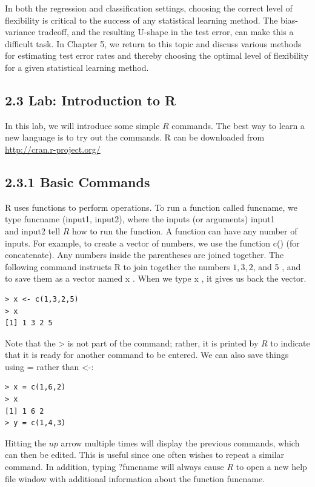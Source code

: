 \documentclass[10pt]{article}
\begin{document}
In both the regression and classification settings, choosing the correct level of flexibility is critical to the success of any statistical learning method. The bias-variance tradeoff, and the resulting U-shape in the test error, can make this a difficult task. In Chapter 5, we return to this topic and discuss various methods for estimating test error rates and thereby choosing the optimal level of flexibility for a given statistical learning method.

\subsection*{2.3 Lab: Introduction to R}
In this lab, we will introduce some simple $R$ commands. The best way to learn a new language is to try out the commands. R can be downloaded from\\
\href{http://cran.r-project.org/}{http://cran.r-project.org/}

\subsection*{2.3.1 Basic Commands}
R uses functions to perform operations. To run a function called funcname, we type funcname (input1, input2), where the inputs (or arguments) input1\\
and input2 tell $R$ how to run the function. A function can have any number of inputs. For example, to create a vector of numbers, we use the function c() (for concatenate). Any numbers inside the parentheses are joined together. The following command instructs R to join together the numbers $1,3,2$, and 5 , and to save them as a vector named x . When we type x , it gives us back the vector.

\begin{verbatim}
> x <- c(1,3,2,5)
> x
[1] 1 3 2 5
\end{verbatim}

Note that the > is not part of the command; rather, it is printed by $R$ to indicate that it is ready for another command to be entered. We can also save things using = rather than <-:

\begin{verbatim}
> x = c(1,6,2)
> x
[1] 1 6 2
> y = c(1,4,3)
\end{verbatim}

Hitting the $u p$ arrow multiple times will display the previous commands, which can then be edited. This is useful since one often wishes to repeat a similar command. In addition, typing ?funcname will always cause $R$ to open a new help file window with additional information about the function funcname.
\end{document}
